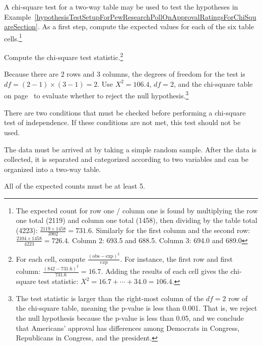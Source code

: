 \begin{exercise}
A chi-square test for a two-way table may be used to test the hypotheses in Example~\ref{hypothesisTestSetupForPewResearchPollOnApprovalRatingsForChiSquareSection}. As a first step, compute the expected values for each of the six table cells.\footnote{The expected count for row one / column one is found by multiplying the row one total (2119) and column one total (1458), then dividing by the table total (4223): $\frac{2119\times 1458}{3902} = 731.6$. Similarly for the first column and the second row: $\frac{2104\times 1458}{4223} = 726.4$. Column 2: 693.5 and 688.5. Column 3: 694.0 and 689.0}
\end{exercise}

\begin{exercise}
Compute the chi-square test statistic.\footnote{For each cell, compute $\frac{(\text{obs} - \text{exp})^2}{exp}$. For instance, the first row and first column: $\frac{(842-731.6)^2}{731.6} = 16.7$. Adding the results of each cell gives the chi-square test statistic: {\scriptsize$X^2 = 16.7 + \cdots + 34.0 = 106.4$}.}
\end{exercise}

\begin{exercise}
Because there are 2 rows and 3 columns, the degrees of freedom for the test is $df=(2-1)\times (3-1) = 2$. Use $X^2=106.4$, $df=2$, and the chi-square table on page~\pageref{chiSquareProbabilityTable} to evaluate whether to reject the null hypothesis.\footnote{The test statistic is larger than the right-most column of the $df=2$ row of the chi-square table, meaning the p-value is less than 0.001. That is, we reject the null hypothesis because the p-value is less than 0.05, and we conclude that Americans' approval has differences among Democrats in Congress, Republicans in Congress, and the president.}
\end{exercise}

\begin{tipBox}{
There are two conditions that must be checked before performing a chi-square test of independence. If these conditions are not met, this test should not be used.\vspace{-1mm}
\begin{description}
\setlength{\itemsep}{0mm}
\item[One simple random sample with two variables/questions.] The data must be arrived at by taking a simple random sample. After the data is collected, it is separated and categorized according to two variables and can be organized into a two-way table.
\item[All Expected Counts at least 5] All of the expected counts must be at least 5.
\vspace{-1mm}
\end{description}}
\end{tipBox}


